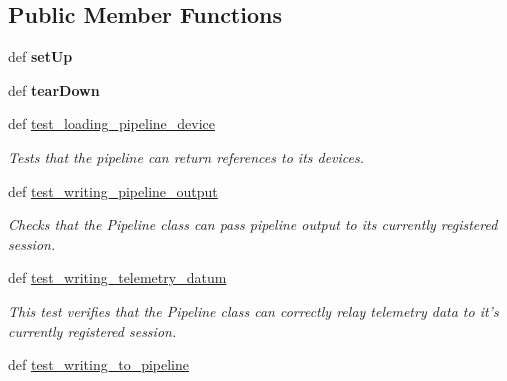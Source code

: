 \subsection*{Public Member Functions}
\begin{DoxyCompactItemize}
\item 
\hypertarget{classhwm_1_1hardware_1_1pipelines_1_1tests_1_1test__pipeline_1_1_test_pipeline_a427de15ae30cf533fa70e9c03e197bbb}{def {\bfseries set\-Up}}\label{classhwm_1_1hardware_1_1pipelines_1_1tests_1_1test__pipeline_1_1_test_pipeline_a427de15ae30cf533fa70e9c03e197bbb}

\item 
\hypertarget{classhwm_1_1hardware_1_1pipelines_1_1tests_1_1test__pipeline_1_1_test_pipeline_ac031a1223aa937d491d47219f064df5b}{def {\bfseries tear\-Down}}\label{classhwm_1_1hardware_1_1pipelines_1_1tests_1_1test__pipeline_1_1_test_pipeline_ac031a1223aa937d491d47219f064df5b}

\item 
\hypertarget{classhwm_1_1hardware_1_1pipelines_1_1tests_1_1test__pipeline_1_1_test_pipeline_a9d8a4572fd6774588f825b4feb808995}{def \hyperlink{classhwm_1_1hardware_1_1pipelines_1_1tests_1_1test__pipeline_1_1_test_pipeline_a9d8a4572fd6774588f825b4feb808995}{test\-\_\-loading\-\_\-pipeline\-\_\-device}}\label{classhwm_1_1hardware_1_1pipelines_1_1tests_1_1test__pipeline_1_1_test_pipeline_a9d8a4572fd6774588f825b4feb808995}

\begin{DoxyCompactList}\small\item\em Tests that the pipeline can return references to its devices. \end{DoxyCompactList}\item 
def \hyperlink{classhwm_1_1hardware_1_1pipelines_1_1tests_1_1test__pipeline_1_1_test_pipeline_a35a7eb6d43b30e9d076797fe20ed413d}{test\-\_\-writing\-\_\-pipeline\-\_\-output}
\begin{DoxyCompactList}\small\item\em Checks that the Pipeline class can pass pipeline output to its currently registered session. \end{DoxyCompactList}\item 
def \hyperlink{classhwm_1_1hardware_1_1pipelines_1_1tests_1_1test__pipeline_1_1_test_pipeline_ab3bcf77e1bc61ef40fa3e703d507218e}{test\-\_\-writing\-\_\-telemetry\-\_\-datum}
\begin{DoxyCompactList}\small\item\em This test verifies that the Pipeline class can correctly relay telemetry data to it's currently registered session. \end{DoxyCompactList}\item 
\hypertarget{classhwm_1_1hardware_1_1pipelines_1_1tests_1_1test__pipeline_1_1_test_pipeline_aa894d0d57cb4ca370d7573800e8dadc0}{def \hyperlink{classhwm_1_1hardware_1_1pipelines_1_1tests_1_1test__pipeline_1_1_test_pipeline_aa894d0d57cb4ca370d7573800e8dadc0}{test\-\_\-writing\-\_\-to\-\_\-pipeline}}\label{classhwm_1_1hardware_1_1pipelines_1_1tests_1_1test__pipeline_1_1_test_pipeline_aa894d0d57cb4ca370d7573800e8dadc0}


\end{DoxyCompactItemize}
